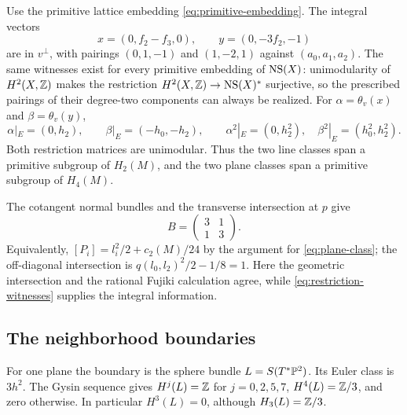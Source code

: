 Use the primitive lattice embedding
\eqref{eq:primitive-embedding}. The integral vectors
\[
 x=(0,f_2-f_3,0),\qquad y=(0,-3f_2,-1)
\]
are in $v^\perp$, with pairings $(0,1,-1)$ and
$(1,-2,1)$ against $(a_0,a_1,a_2)$.
The same witnesses exist for every primitive embedding of
$\operatorname{NS}(X)$: unimodularity of $H^2(X,\mathbb Z)$ makes the restriction
$H^2(X,\mathbb Z)\to\operatorname{NS}(X)^*$ surjective, so the prescribed
pairings of their degree-two components can always be realized.
For
$\alpha=\theta_v(x)$ and $\beta=\theta_v(y)$,
\begin{equation}\label{eq:restriction-witnesses}
 \alpha|_E=(0,h_2),\qquad \beta|_E=(-h_0,-h_2),
 \qquad
 \alpha^2|_E=(0,h_2^2),\quad
 \beta^2|_E=(h_0^2,h_2^2).
\end{equation}
Both restriction matrices are unimodular. Thus the
two line classes span a primitive subgroup of
$H_2(M)$, and the two plane classes span a primitive
subgroup of $H_4(M)$.

The cotangent normal bundles and the transverse
intersection at $p$ give
\begin{equation}\label{eq:two-plane-matrix}
 B=\begin{pmatrix}3&1\\1&3\end{pmatrix}.
\end{equation}
Equivalently, $[P_i]=l_i^2/2+c_2(M)/24$ by the
argument for \eqref{eq:plane-class}; the off-diagonal
intersection is $q(l_0,l_2)^2/2-1/8=1$.
Here the geometric intersection and the rational
Fujiki calculation agree, while
\eqref{eq:restriction-witnesses} supplies the integral
information.

\subsection{The neighborhood boundaries}
For one plane the boundary is the sphere bundle
$L=S(T^*\mathbb P^2)$. Its Euler class is $3h^2$.
The Gysin sequence gives $H^j(L)=\mathbb Z$ for
$j=0,2,5,7$, $H^4(L)=\mathbb Z/3$, and zero otherwise.
In particular $H^3(L)=0$, although $H_3(L)=\mathbb Z/3$.

